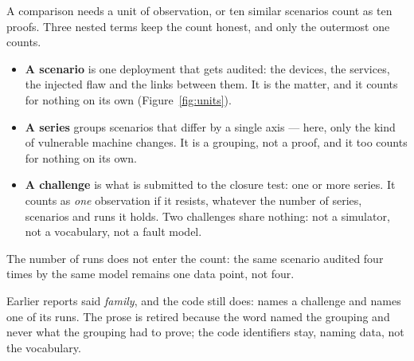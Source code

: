 A comparison needs a unit of observation, or ten similar scenarios count as ten
proofs. Three nested terms keep the count honest, and only the outermost one
counts.

\begin{itemize}[leftmargin=1.2em,itemsep=.35em,topsep=.4em]
\item \textbf{A scenario} is one deployment that gets audited: the devices, the
services, the injected flaw and the links between them. It is the matter, and it
counts for nothing on its own (Figure~\ref{fig:units}).
\item \textbf{A series} groups scenarios that differ by a single axis --- here,
only the kind of vulnerable machine changes. It is a grouping, not a proof, and it
too counts for nothing on its own.
\item \textbf{A challenge} is what is submitted to the closure test: one or more
series. It counts as \emph{one} observation if it resists, whatever the number of
series, scenarios and runs it holds. Two challenges share nothing: not a simulator,
not a vocabulary, not a fault model.
\end{itemize}

The number of runs does not enter the count: the same scenario audited four times
by the same model remains one data point, not four.

Earlier reports said \emph{family}, and the code still does: 
names a challenge and  names one of its runs. The prose is retired
because the word named the grouping and never what the grouping had to prove; the
code identifiers stay, naming data, not the vocabulary.

